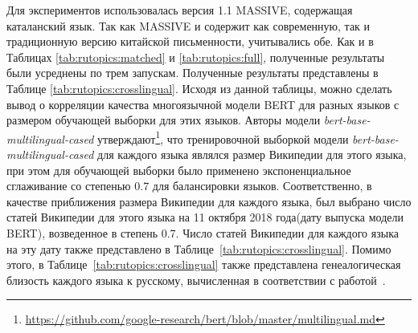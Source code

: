 Для экспериментов использовалась версия 1.1 {MASSIVE}, содержащая каталанский язык. Так как {MASSIVE} и содержит как современную, так и традиционную версию китайской письменности, учитывались обе. Как и в Таблицах \ref{tab:rutopics:matched} и \ref{tab:rutopics:full}, полученные результаты были усреднены по трем запускам.
Полученные результаты представлены в Таблице \ref{tab:rutopics:crosslingual}. Исходя из данной таблицы, можно сделать вывод о корреляции качества многоязычной модели BERT для разных языков с размером обучающей выборки для этих языков. Авторы модели \textit{bert-base-multilingual-cased} утверждают\footnote{\url{https://github.com/google-research/bert/blob/master/multilingual.md}}, что тренировочной выборкой модели \textit{bert-base-multilingual-cased} для каждого языка являлся размер Википедии для этого языка, при этом для обучающей выборки было применено экспоненциальное сглаживание со степенью 0.7 для балансировки языков.
Соответственно, в качестве приближения размера Википедии для каждого языка, был выбрано число статей Википедии для этого языка на 11 октября 2018 года(дату выпуска модели BERT), возведенное в степень 0.7.  Число статей Википедии для каждого языка на эту дату также представлено в Таблице~\ref{tab:rutopics:crosslingual}. Помимо этого, в Таблице~\ref{tab:rutopics:crosslingual} также представлена генеалогическая близость каждого языка к русскому, вычисленная в соответствии с работой~\cite{lang_sim}. 

